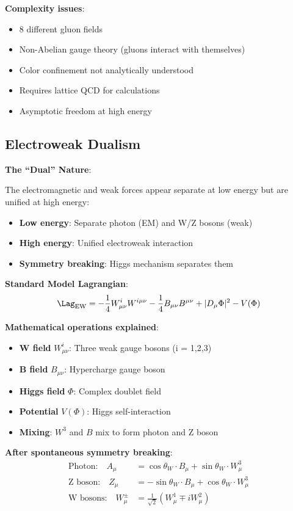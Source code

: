 	\textbf{Complexity issues}:
	\begin{itemize}
		\item 8 different gluon fields
		\item Non-Abelian gauge theory (gluons interact with themselves)
		\item Color confinement not analytically understood
		\item Requires lattice QCD for calculations
		\item Asymptotic freedom at high energy
	\end{itemize}
	
	\subsection{Electroweak Dualism}
	
	\textbf{The ``Dual'' Nature}:
	
	The electromagnetic and weak forces appear separate at low energy but are unified at high energy:
	
	\begin{itemize}
		\item \textbf{Low energy}: Separate photon (EM) and W/Z bosons (weak)
		\item \textbf{High energy}: Unified electroweak interaction
		\item \textbf{Symmetry breaking}: Higgs mechanism separates them
	\end{itemize}
	
	\textbf{Standard Model Lagrangian}:
	\begin{equation}
		\Lag_{\text{EW}} = -\frac{1}{4} W_{\mu\nu}^i W^{i\mu\nu} - \frac{1}{4} B_{\mu\nu} B^{\mu\nu} + |D_\mu \Phi|^2 - V(\Phi)
	\end{equation}
	
	\textbf{Mathematical operations explained}:
	\begin{itemize}
		\item \textbf{W field} $W_{\mu\nu}^i$: Three weak gauge bosons (i = 1,2,3)
		\item \textbf{B field} $B_{\mu\nu}$: Hypercharge gauge boson
		\item \textbf{Higgs field} $\Phi$: Complex doublet field
		\item \textbf{Potential} $V(\Phi)$: Higgs self-interaction
		\item \textbf{Mixing}: $W^3$ and $B$ mix to form photon and Z boson
	\end{itemize}
	
	\textbf{After spontaneous symmetry breaking}:
	\begin{align}
		\text{Photon:} \quad A_\mu &= \cos\theta_W \cdot B_\mu + \sin\theta_W \cdot W_\mu^3 \\
		\text{Z boson:} \quad Z_\mu &= -\sin\theta_W \cdot B_\mu + \cos\theta_W \cdot W_\mu^3 \\
		\text{W bosons:} \quad W_\mu^\pm &= \frac{1}{\sqrt{2}}(W_\mu^1 \mp i W_\mu^2)
	\end{align}
	
